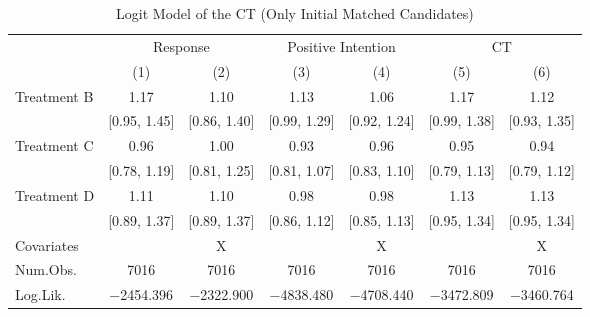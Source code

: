\documentclass[12pt, a4paper]{article}
\begin{document}
\begin{landscape}\begin{table}[H]

\caption{\label{tab:logit-reply-test-initial-matched}Logit Model of the CT (Only Initial Matched Candidates)}
\centering
\fontsize{8}{10}\selectfont
\begin{threeparttable}
\begin{tabular}[t]{lcccccc}
\toprule
\multicolumn{1}{c}{ } & \multicolumn{2}{c}{Response} & \multicolumn{2}{c}{Positive Intention} & \multicolumn{2}{c}{CT} \\
\cmidrule(l{3pt}r{3pt}){2-3} \cmidrule(l{3pt}r{3pt}){4-5} \cmidrule(l{3pt}r{3pt}){6-7}
  & (1) & (2) & (3) & (4) & (5) & (6)\\
\midrule
Treatment B & \num{1.17} & \num{1.10} & \num{1.13} & \num{1.06} & \num{1.17} & \num{1.12}\\
 & {}[\num{0.95}, \num{1.45}] & {}[\num{0.86}, \num{1.40}] & {}[\num{0.99}, \num{1.29}] & {}[\num{0.92}, \num{1.24}] & {}[\num{0.99}, \num{1.38}] & {}[\num{0.93}, \num{1.35}]\\
Treatment C & \num{0.96} & \num{1.00} & \num{0.93} & \num{0.96} & \num{0.95} & \num{0.94}\\
 & {}[\num{0.78}, \num{1.19}] & {}[\num{0.81}, \num{1.25}] & {}[\num{0.81}, \num{1.07}] & {}[\num{0.83}, \num{1.10}] & {}[\num{0.79}, \num{1.13}] & {}[\num{0.79}, \num{1.12}]\\
Treatment D & \num{1.11} & \num{1.10} & \num{0.98} & \num{0.98} & \num{1.13} & \num{1.13}\\
 & {}[\num{0.89}, \num{1.37}] & {}[\num{0.89}, \num{1.37}] & {}[\num{0.86}, \num{1.12}] & {}[\num{0.85}, \num{1.13}] & {}[\num{0.95}, \num{1.34}] & {}[\num{0.95}, \num{1.34}]\\
\midrule
Covariates &  & X &  & X &  & X\\
Num.Obs. & \num{7016} & \num{7016} & \num{7016} & \num{7016} & \num{7016} & \num{7016}\\
Log.Lik. & \num{-2454.396} & \num{-2322.900} & \num{-4838.480} & \num{-4708.440} & \num{-3472.809} & \num{-3460.764}\\
\bottomrule
\end{tabular}
\begin{tablenotes}

\end{tablenotes}
\end{threeparttable}
\end{table}
\end{landscape}
\end{document}
